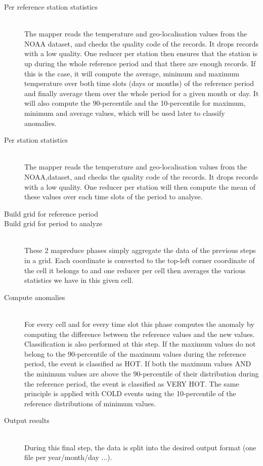 \begin{description}
\item[Per reference station statistics] \hfill \\
The mapper reads the temperature and geo-localisation values from the NOAA dataset, and checks the quality code of the records. It drops records with a low quality. One reducer per station then ensures that the station is up during the whole reference period and that there are enough records. If this is the case, it will compute the average, minimum and maximum temperature over both time slots (days or months) of the reference period and finally average them over the whole period for a given month or day. It will also compute the 90-percentile and the 10-percentile for maximum, minimum and average values, which will be used later to classify anomalies.
\item[Per station statistics] \hfill \\
The mapper reads the temperature and geo-localisation values from the NOAA,dataset, and checks the quality code of the records. It drops records with a low quality. One reducer per station will then compute the mean of these values over each time slots of the period to analyse.
\item[Build grid for reference period]
\item[Build grid for period to analyze] \hfill \\
These 2 mapreduce phases simply aggregate the data of the previous steps in a grid. Each coordinate is converted to the top-left corner coordinate of the cell it belongs to and one reducer per cell then averages the various statistics we have in this given cell.
\item[Compute anomalies] \hfill \\
For every cell and for every time slot this phase computes the anomaly by computing the difference between the reference values and the new values. Classification is also performed at this step. If the maximum values do not belong to the 90-percentile of the maximum values during the reference period, the event is classified as HOT. If both the maximum values AND the minimum values are above the 90-percentile of their distribution during the reference period, the event is classified as VERY HOT. The same principle is applied with COLD events using the 10-percentile of the reference distributions of minimum values.
\item[Output results] \hfill \\
During this final step, the data is split into the desired output format (one file per year/month/day ...).
\end{description}

